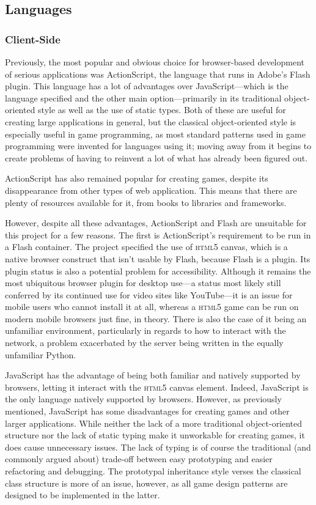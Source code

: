 \subsection{Languages}
\subsubsection{Client-Side}
Previously, the most popular and obvious choice for browser-based development of serious applications was ActionScript, the language that runs in Adobe's Flash plugin. This language has a lot of advantages over JavaScript---which is the language specified and the other main option---primarily in its traditional object-oriented style as well as the use of static types. Both of these are useful for creating large applications in general, but the classical object-oriented style is especially useful in game programming, as most standard patterns used in game programming were invented for languages using it; moving away from it begins to create problems of having to reinvent a lot of what has already been figured out.

ActionScript has also remained popular for creating games, despite its disappearance from other types of web application. This means that there are plenty of resources available for it, from books to libraries and frameworks.

However, despite all these advantages, ActionScript and Flash are unsuitable for this project for a few reasons. The first is ActionScript's requirement to be run in a Flash container. The project specified the use of \textsc{html5} canvas, which is a native browser construct that isn't usable by Flash, because Flash is a plugin. Its plugin status is also a potential problem for accessibility. Although it remains the most ubiquitous browser plugin for desktop use---a status most likely still conferred by its continued use for video sites like YouTube---it is an issue for mobile users who cannot install it at all, whereas a \textsc{html5} game can be run on modern mobile browsers just fine, in theory. There is also the case of it being an unfamiliar environment, particularly in regards to how to interact with the network, a problem exacerbated by the server being written in the equally unfamiliar Python.

JavaScript has the advantage of being both familiar and natively supported by browsers, letting it interact with the \textsc{html5} canvas element. Indeed, JavaScript is the only language natively supported by browsers. However, as previously mentioned, JavaScript has some disadvantages for creating games and other larger applications. While neither the lack of a more traditional object-oriented structure nor the lack of static typing make it unworkable for creating games, it does cause unnecessary issues. The lack of typing is of course the traditional (and commonly argued about) trade-off between easy prototyping and easier refactoring and debugging. The prototypal inheritance style verses the classical class structure is more of an issue, however, as all game design patterns are designed to be implemented in the latter.

